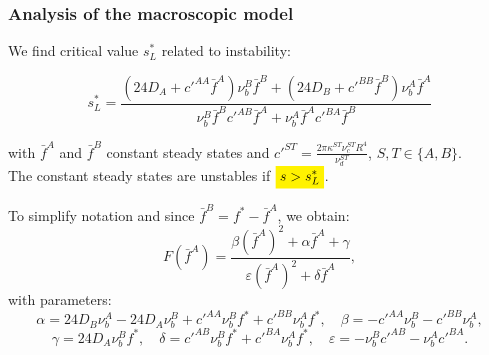 \documentclass[10pt]{beamer}
\newcommand\eps{\varepsilon}
\newcommand\ka{\kappa}
\def \p {{\partial}}
\def \a {{\alpha}}
\def \b {{\beta}}
\def \g {{\gamma}}
\def \d {{\delta}}
\def \bfA {{\bar{f}^A}}
\def \bfB {{\bar{f}^B}}
\theoremstyle{remark}
\newcommand\Fontvii{\fontsize{9}{7.2}\selectfont}
\newcommand{\highlight}[1]{%
	\colorbox{yellow}{$\displaystyle#1$}}
\begin{document}
\begin{frame}
\frametitle{Analysis of the macroscopic model}
\Fontvii
We find critical value $s_{L}^{*}$ related to instability:

$$
s^{*}_{L}=\frac{(24 D_A+c'^{AA}\bfA)\nu_{b}^{B}\bfB+(24 D_B+c'^{BB}\bfB)\nu_{b}^{A}\bar{f}^A}{\nu_{b}^{B}\bfB c'^{AB}\bfA+\nu_{b}^{A}\bar{f}^A c'^{BA}\bfB}
$$

with $\bar{f}^A$ and $\bar{f}^B$ constant steady states and 
$c'^{ST}=\frac{2\pi  \ka^{ST} \nu_c^{ST} R^{4}}{\nu_d^{ST}}$, $S,T \in \{ A,B \}$. \\
The constant steady states are unstables if $\highlight{s>s^{*}_{L}}$.

To simplify notation and since $\bar{f}^B=f^*-\bar{f}^A$, 
we obtain:
$$F(\bfA)=\frac{ \b (\bfA)^2 + \a \bfA + \g}{ \eps(\bfA)^2+\d \bfA }, $$ 
with parameters:
$$
\a= 24D_B \nu_b^A -24 D_A \nu_b^B +c'^{AA} \nu_b^B f^* + c'^{BB} \nu_b^A f^*, \quad
\b=-c'^{AA} \nu_b^B -c'^{BB} \nu_b^A, $$
$$ \g= 24 D_A \nu_b^B f^*, \quad 
\d= c'^{AB}\nu_b^B f^*+c'^{BA} \nu_b^A f^*, \quad
\eps= -\nu_b^B c'^{AB}-	\nu_b^A c'^{BA}.
$$
\end{frame}
\end{document}
